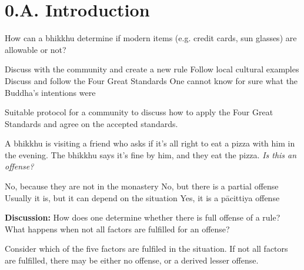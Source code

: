 \chapter{0.A. Introduction}
\renewcommand*{\theChapterTitle}{A. Introduction}

\begin{exam}{\autoExamName}

\begin{problem}

  How can a bhikkhu determine if modern items (e.g. credit cards, sun glasses) are allowable or not?

  \bigskip

  \begin{answers}{1}
    \bChoices
     Discuss with the community and create a new rule\eAns
     Follow local cultural examples\eAns
     Discuss and follow the Four Great Standards\eAns
     One cannot know for sure what the Buddha's intentions were\eAns
    \eChoices
  \end{answers}

  \begin{solution}
    Suitable protocol for a community to discuss how to apply the Four Great
    Standards and agree on the accepted standards.
  \end{solution}

\end{problem}

\problemDivide

\begin{problem}

  A bhikkhu is visiting a friend who asks if it's all right to eat a pizza with
  him in the evening. The bhikkhu says it's fine by him, and they eat the pizza.
  \emph{Is this an offense?}

  \bigskip

  \begin{answers}{1}
    \bChoices
     No, because they are not in the monastery\eAns
     No, but there is a partial offense\eAns
     Usually it is, but it can depend on the situation\eAns
     Yes, it is a pācittiya offense\eAns
    \eChoices
  \end{answers}

  \bigskip

  \textbf{Discussion:} How does one determine whether there is full offense of a
  rule? What happens when not all factors are fulfilled for an offense?

  \begin{solution}
    Consider which of the five factors are fulfiled in the situation. If not all
    factors are fulfilled, there may be either no offense, or a derived lesser
    offense.
  \end{solution}


\end{problem}
\end{exam}
